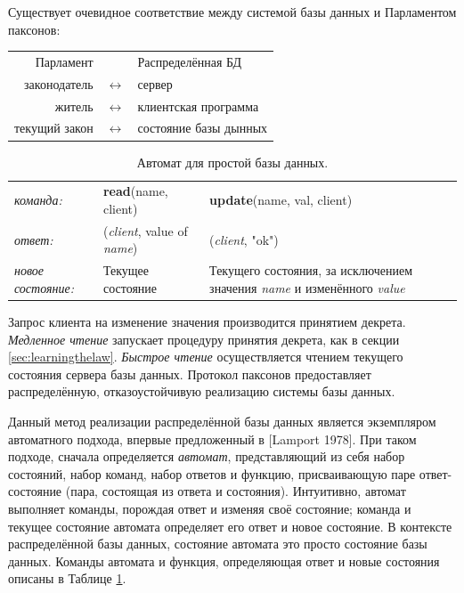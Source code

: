 \documentclass[12pt, a4paper]{article} %
\begin{document}
Существует очевидное соответствие между системой базы данных и Парламентом паксонов:
\begin{table}[h]
\begin{center}
\begin{tabular}{rcl}
    Парламент&&Распределённая БД\\
    законодатель&$\leftrightarrow$&сервер\\
    житель&$\leftrightarrow$&клиентская программа\\
    текущий закон&$\leftrightarrow$&состояние базы дынных\\
\end{tabular}
\end{center}
\end{table}


\begin{table}[h]
\begin{tabular}{lp{4cm}p{3.6cm}}
    \textit{команда:}&\textbf{read}(name, client)&\textbf{update}(name, val, client)\\
    \textit{ответ:}&(\textit{client}, value of \textit{name})&(\textit{client}, "ok")\\
    \textit{новое состояние:}&Текущее состояние&Текущего состояния, за исключением значения \textit{name} и изменённого \textit{value}\\
\end{tabular}
\caption{Автомат для простой базы данных.}
\label{table:1}
\end{table}
Запрос клиента на изменение значения производится принятием декрета. \textit{Медленное чтение} запускает процедуру принятия декрета, как в секции \ref{sec:learningthelaw}. \textit{Быстрое чтение} осуществляется чтением текущего состояния сервера базы данных. Протокол паксонов предоставляет распределённую, отказоустойчивую реализацию системы базы данных.

Данный метод реализации распределённой базы данных является экземпляром автоматного подхода, впервые предложенный в [Lamport 1978]. При таком подходе, сначала определяется \textit{автомат}, представляющий из себя набор состояний, набор команд, набор ответов и функцию, присваивающую паре ответ-состояние (пара, состоящая из ответа и состояния). Интуитивно, автомат выполняет команды, порождая ответ и изменяя своё состояние; команда и текущее состояние автомата определяет его ответ и новое состояние. В контексте распределённой базы данных, состояние автомата это просто состояние базы данных. Команды автомата и функция, определяющая ответ и новые состояния описаны в Таблице \ref{table:1}.
\end{document}
